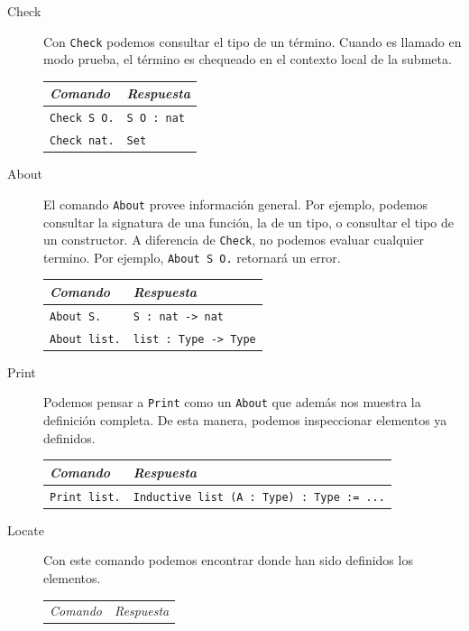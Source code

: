 \begin{description}
  \item[Check] Con \texttt{Check} podemos consultar el tipo de un término. Cuando es llamado en modo prueba, el término es chequeado en el contexto local de la submeta.
  \begin{center}
  \begin{tabular}{| l | l |}
  \hline
  \emph{Comando} & \emph{Respuesta} \\
  \hline
  \texttt{Check S O.} & \texttt{S O : nat} \\
  \texttt{Check nat.} & \texttt{Set} \\
  \hline
  \end{tabular}
  \end{center}
  \item[About] El comando \texttt{About} provee información general. Por ejemplo, podemos consultar la signatura de una función, la de un tipo, o consultar el tipo de un constructor. A diferencia de \texttt{Check}, no podemos evaluar cualquier termino. Por ejemplo, \texttt{About S O.} retornará un error.
  \begin{center}
  \begin{tabular}{| l | l |}
  \hline
  \emph{Comando} & \emph{Respuesta} \\
  \hline
  \texttt{About S.} & \texttt{S : nat -> nat} \\
  \texttt{About list.} & \texttt{list : Type -> Type} \\
  \hline
  \end{tabular}
  \end{center}
  \item[Print] Podemos pensar a \texttt{Print} como un \texttt{About} que además nos muestra la definición completa. De esta manera, podemos inspeccionar elementos ya definidos.
  \begin{center}
  \begin{tabular}{| l | l |}
  \hline
  \emph{Comando} & \emph{Respuesta} \\
  \hline
  \texttt{Print list.} & \texttt{Inductive list (A : Type) : Type := ...} \\
  \hline
  \end{tabular}
  \end{center}
  \item[Locate] Con este comando podemos encontrar donde han sido definidos los elementos. 
  \begin{center}
  \begin{tabular}{| l | l |}
  \hline
  \emph{Comando} & \emph{Respuesta} \\

\end{tabular}
\end{center}
\end{description}
